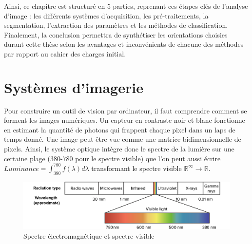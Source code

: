 \documentclass[../thesis.tex]{subfiles}
\begin{document}
    Ainsi, ce chapitre est structuré en 5 parties, reprenant ces étapes clés de l'analyse d'image : les différents systèmes d'acquisition, les pré-traitements, la segmentation, l'extraction des paramètres et les méthodes de classification. Finalement, la conclusion permettra de synthétiser les orientations choisies durant cette thèse selon les avantages et inconvénients de chacune des méthodes par rapport au cahier des charges initial. 
    
    
    
    \newpage
    \section{Systèmes d'imagerie}
    
    \par Pour construire un outil de vision par ordinateur, il faut comprendre comment se forment les images numériques. Un capteur en contraste noir et blanc fonctionne en estimant la quantité de photons qui frappent chaque pixel dans un laps de temps donné. Une image peut être vue comme une matrice bidimensionnelle de pixels. Ainsi, le système optique intègre donc le spectre de la lumière sur une certaine plage (380-780 pour le spectre visible) que l'on peut aussi écrire $Luminance = \int_{380}^{780} f(\lambda) d\lambda$ transformant le spectre visible $\mathbb{R}^\infty \rightarrow \mathbb{R}$.
    
    \vfill
    \begin{figure}[H]
        \centering
        \includegraphics[width=0.7\linewidth]{img/biblio/wavelength}
        \caption{Spectre électromagnétique et spectre visible}
        \label{fig:03-wavelength}
    \end{figure}
    \vfill
    
\end{document}
